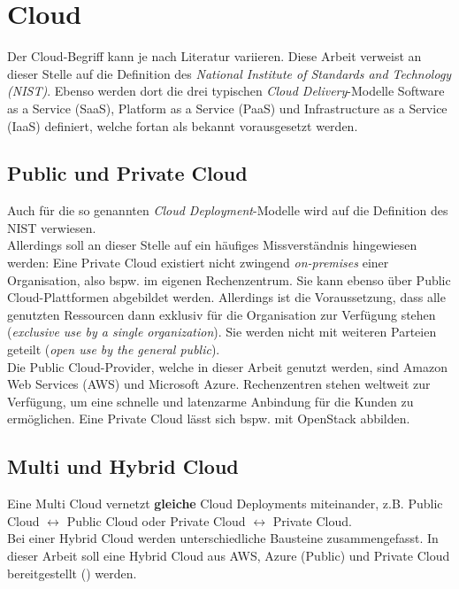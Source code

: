 \section{Cloud}\label{cloud}
Der Cloud-Begriff kann je nach Literatur variieren. Diese Arbeit verweist an dieser Stelle auf die Definition des \textit{National Institute of Standards and Technology (NIST)}. Ebenso werden dort die drei typischen \textit{Cloud Delivery}-Modelle Software as a Service (SaaS), Platform as a Service (PaaS) und Infrastructure as a Service (IaaS) definiert, welche fortan als bekannt vorausgesetzt werden.\cite{mell2011}

\subsection{Public und Private Cloud}
Auch für die so genannten \textit{Cloud \gls{Deployment}}-Modelle wird auf die Definition des NIST verwiesen.\cite{mell2011}\\
Allerdings soll an dieser Stelle auf ein häufiges Missverständnis hingewiesen werden: Eine Private Cloud existiert nicht zwingend \textit{on-premises} einer Organisation, also bspw. im eigenen Rechenzentrum. Sie kann ebenso über Public Cloud-Plattformen abgebildet werden. Allerdings ist die Voraussetzung, dass alle genutzten Ressourcen dann exklusiv für die Organisation zur Verfügung stehen (\textit{exclusive use by a single organization}). Sie werden nicht mit weiteren Parteien geteilt (\textit{open use by the general public}).\\
Die Public Cloud-Provider, welche in dieser Arbeit genutzt werden, sind Amazon Web Services (AWS) und Microsoft Azure. Rechenzentren stehen weltweit zur Verfügung, um eine schnelle und latenzarme Anbindung für die Kunden zu ermöglichen. Eine Private Cloud lässt sich bspw. mit OpenStack abbilden\cite{sefraoui2012openstack}.

\subsection{Multi und Hybrid Cloud}
Eine Multi Cloud vernetzt \textbf{gleiche} Cloud \gls{Deployment}s miteinander, z.B. Public Cloud 	$\leftrightarrow$ Public Cloud oder Private Cloud $\leftrightarrow$ Private Cloud.\\
Bei einer Hybrid Cloud werden unterschiedliche Bausteine zusammengefasst. In dieser Arbeit soll eine Hybrid Cloud aus AWS, Azure (Public) und Private Cloud bereitgestellt (\grqq{}) werden.

